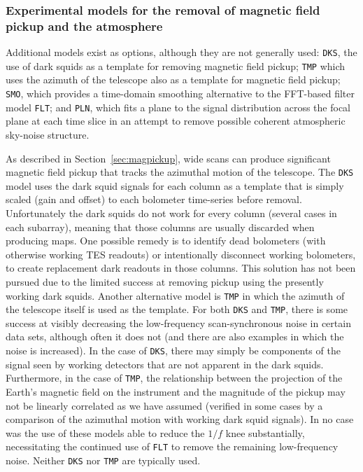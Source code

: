 \documentclass[useAMS,usenatbib,nofootinbib]{mn2e}
\newcommand{\model}[1]{\texttt{#1}}
\begin{document}
\subsubsection{Experimental models for the removal of magnetic field
  pickup and the atmosphere}
\label{sec:experimental}

Additional models exist as options, although they are not generally
used: \model{DKS}, the use of dark squids as a template for removing
magnetic field pickup; \model{TMP} which uses the azimuth of the
telescope also as a template for magnetic field pickup; \model{SMO},
which provides a time-domain smoothing alternative to the FFT-based
filter model \model{FLT}; and \model{PLN}, which fits a plane to the
signal distribution across the focal plane at each time slice in an
attempt to remove possible coherent atmospheric sky-noise structure.

As described in Section~\ref{sec:magpickup}, wide scans can produce
significant magnetic field pickup that tracks the azimuthal motion of
the telescope. The \model{DKS} model uses the dark squid signals for
each column as a template that is simply scaled (gain and offset) to
each bolometer time-series before removal. Unfortunately the dark
squids do not work for every column (several cases in each subarray),
meaning that those columns are usually discarded when producing
maps. One possible remedy is to identify dead bolometers (with
otherwise working TES readouts) or intentionally disconnect working
bolometers, to create replacement dark readouts in those columns. This
solution has not been pursued due to the limited success at removing
pickup using the presently working dark squids. Another alternative
model is \model{TMP} in which the azimuth of the telescope itself is
used as the template. For both \model{DKS} and \model{TMP}, there is
some success at visibly decreasing the low-frequency scan-synchronous
noise in certain data sets, although often it does not (and there are
also examples in which the noise is increased). In the case of
\model{DKS}, there may simply be components of the signal seen by
working detectors that are not apparent in the dark
squids. Furthermore, in the case of \model{TMP}, the relationship
between the projection of the Earth's magnetic field on the instrument
and the magnitude of the pickup may not be linearly correlated as we
have assumed (verified in some cases by a comparison of the azimuthal
motion with working dark squid signals). In no case was the use of
these models able to reduce the $1/f$ knee substantially,
necessitating the continued use of \model{FLT} to remove the remaining
low-frequency noise. Neither \model{DKS} nor \model{TMP} are typically
used.
\end{document}

